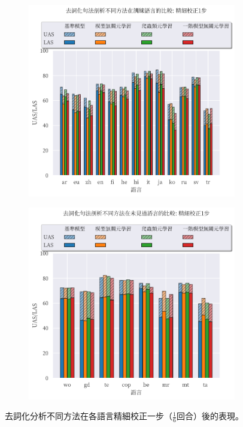 \begin{figure}[htbp]
    \centering
    \begin{subfigure}[t]{0.8\textwidth}
        \centering
        \includegraphics[width=\textwidth]{figs/chapter3/delex/bar_one_step_train_langs.pdf}
    \end{subfigure}
    \vspace{-12pt}
    \begin{subfigure}[t]{0.8\textwidth}
        \centering
        \includegraphics[width=\textwidth]{figs/chapter3/delex/bar_one_step_test_langs.pdf}
    \end{subfigure}
    \caption{去詞化分析不同方法在各語言精細校正一步（$\frac{1}{6}$回合）後的表現。}
    \label{fig:bar_one_step}
\end{figure}